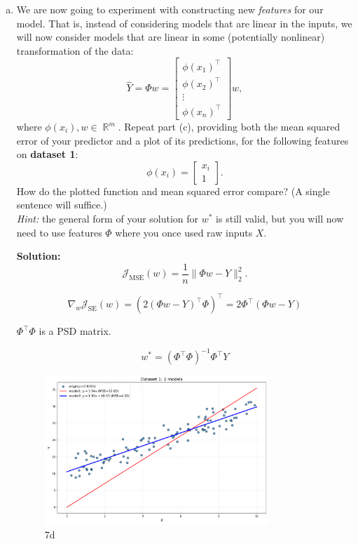 \documentclass{article}
\DeclareMathOperator{\R}{\mathbb{R}}
\newenvironment{solution}{\color{blue} \smallskip \textbf{Solution:}}{}
\begin{document}
\begin{enumerate}[(a)]
\begin{solution}
        code: hw1\_waz.ipynb
        \[ \qedhere \]
    \end{solution}
    
    \item
    We are now going to experiment with constructing new \emph{features} for our model. 
    That is, instead of considering models that are linear in the inputs, we will now consider models that are linear in some (potentially nonlinear) transformation of the data:
    \[
        \hat{Y} = \Phi w = \begin{bmatrix}
            \phi(x_1)^\top \\
            \phi(x_2)^\top \\
            \vdots \\
            \phi(x_n)^\top
        \end{bmatrix} w,
    \]
    where $\phi(x_i), w \in \R^m$.
    Repeat part (c), providing both the mean squared error of your predictor and a plot of its predictions, for the following features on \textbf{dataset 1}:
    \[
        \phi(x_i) = \begin{bmatrix}
            x_i \\
            1
        \end{bmatrix}.
    \]
    How do the plotted function and mean squared error compare? (A single sentence will suffice.) \\
    \emph{Hint:} the general form of your solution for $w^*$ is still valid, but you will now need to use features $\Phi$ where you once used raw inputs $X$.

    \begin{solution}
        $$\mathcal{J}_\text{MSE}(w) = \frac{1}{n} \| \Phi w - Y \|_2^2.$$

        $$\nabla_w \mathcal{J}_\text{SE}(w) = (2(\Phi w-Y)^\top \Phi)^\top = 2\Phi^\top(\Phi w-Y)$$

        $\Phi^\top \Phi$ is a PSD matrix.

        $$w^* = (\Phi^\top \Phi)^{-1}\Phi^\top Y$$

        \begin{figure}[htbp]
        \centering
        \includegraphics[width=0.8\textwidth]{problem_7d.png} 
        \caption{7d} 
        \label{fig:fig7d} 
        \end{figure}


\end{solution}
\end{enumerate}
\end{document}
